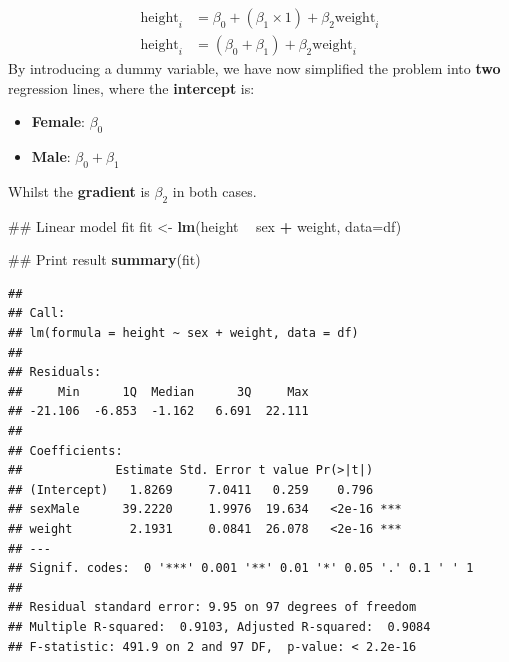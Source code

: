 \documentclass[]{book}
\newenvironment{Shaded}{\begin{snugshade}}{\end{snugshade}}
\newcommand{\KeywordTok}[1]{\textcolor[rgb]{0.13,0.29,0.53}{\textbf{#1}}}
\newcommand{\DataTypeTok}[1]{\textcolor[rgb]{0.13,0.29,0.53}{#1}}
\newcommand{\StringTok}[1]{\textcolor[rgb]{0.31,0.60,0.02}{#1}}
\newcommand{\OperatorTok}[1]{\textcolor[rgb]{0.81,0.36,0.00}{\textbf{#1}}}
\newcommand{\NormalTok}[1]{#1}
\providecommand{\tightlist}{%
  \setlength{\itemsep}{0pt}\setlength{\parskip}{0pt}}
\theoremstyle{definition}
\theoremstyle{definition}
\theoremstyle{definition}
\theoremstyle{remark}
\begin{document}
\[
\begin{aligned}
    \mathrm{height}_i & = \beta_0 + (\beta_1 \times 1) + \beta_2\mathrm{weight}_i\\
    \mathrm{height}_i & = (\beta_0 + \beta_1) + \beta_2\mathrm{weight}_i
\end{aligned}
\] By introducing a dummy variable, we have now simplified the problem
into \textbf{two} regression lines, where the \textbf{intercept} is:

\begin{itemize}
\tightlist
\item
  \textbf{Female}: \(\beta_0\)
\item
  \textbf{Male}: \(\beta_0 + \beta_1\)
\end{itemize}

Whilst the \textbf{gradient} is \(\beta_2\) in both cases.

\begin{Shaded}
\begin{Highlighting}[]
\NormalTok{## Linear model fit}
\NormalTok{fit <-}\StringTok{ }\KeywordTok{lm}\NormalTok{(height }\OperatorTok{~}\StringTok{ }\NormalTok{sex }\OperatorTok{+}\StringTok{ }\NormalTok{weight, }\DataTypeTok{data=}\NormalTok{df)}
\end{Highlighting}
\end{Shaded}

\newpage

\begin{Shaded}
\begin{Highlighting}[]
\NormalTok{## Print result}
\KeywordTok{summary}\NormalTok{(fit)}
\end{Highlighting}
\end{Shaded}

\begin{verbatim}
## 
## Call:
## lm(formula = height ~ sex + weight, data = df)
## 
## Residuals:
##     Min      1Q  Median      3Q     Max 
## -21.106  -6.853  -1.162   6.691  22.111 
## 
## Coefficients:
##             Estimate Std. Error t value Pr(>|t|)    
## (Intercept)   1.8269     7.0411   0.259    0.796    
## sexMale      39.2220     1.9976  19.634   <2e-16 ***
## weight        2.1931     0.0841  26.078   <2e-16 ***
## ---
## Signif. codes:  0 '***' 0.001 '**' 0.01 '*' 0.05 '.' 0.1 ' ' 1
## 
## Residual standard error: 9.95 on 97 degrees of freedom
## Multiple R-squared:  0.9103, Adjusted R-squared:  0.9084 
## F-statistic: 491.9 on 2 and 97 DF,  p-value: < 2.2e-16
\end{verbatim}
\end{document}
